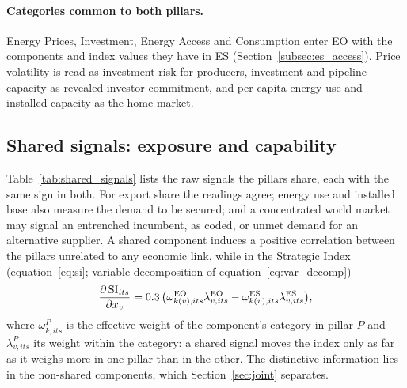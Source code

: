 \paragraph{Categories common to both pillars.}\label{subsec:eo_common} Energy Prices, Investment,
Energy Access and Consumption enter EO with the components and index values they have in ES
(Section~\ref{subsec:es_access}). Price volatility is read as investment risk for producers,
investment and pipeline capacity as revealed investor commitment, and per-capita energy use and
installed capacity as the home market.

\subsection{Shared signals: exposure and capability}\label{subsec:eo_shared}

Table~\ref{tab:shared_signals} lists the raw signals the pillars share, each with the same sign in
both. For export share the readings agree; energy use and installed base also measure the demand
to be secured; and a concentrated world market may signal an entrenched incumbent, as coded, or
unmet demand for an alternative supplier. A shared component induces a positive correlation between
the pillars unrelated to any economic link, while in the Strategic Index (equation~\eqref{eq:si};
variable decomposition of equation~\eqref{eq:var_decomp})
\begin{equation}\label{eq:eo_si_shared}
  \frac{\partial\,\mathrm{SI}_{its}}{\partial x_v}=0.3\,\big(\omega^{\mathrm{EO}}_{k(v),its}\lambda^{\mathrm{EO}}_{v,its}
  -\omega^{\mathrm{ES}}_{k(v),its}\lambda^{\mathrm{ES}}_{v,its}\big),
\end{equation}
where $\omega^{P}_{k,its}$ is the effective weight of the component's category in pillar $P$ and
$\lambda^{P}_{v,its}$ its weight within the category: a shared signal moves the index only as far
as it weighs more in one pillar than in the other. The distinctive information lies in the
non-shared components, which Section~\ref{sec:joint} separates.

